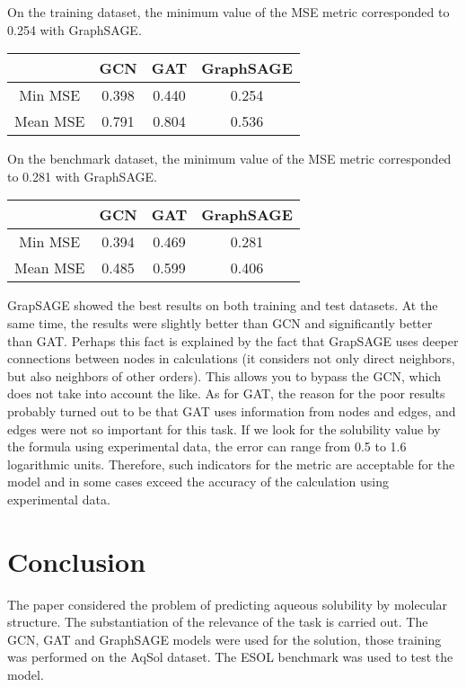 \documentclass[a4paper,14pt]{article}
\begin{document}
On the training dataset, the minimum value of the MSE metric corresponded to 0.254 with GraphSAGE.
\begin{center}
\begin{tabular}{ |c|c|c|c| }
\hline
  & GCN & GAT & GraphSAGE \\ 
 \hline
 Min MSE & 0.398 & 0.440 & 0.254 \\  
 \hline
 Mean MSE & 0.791 & 0.804 & 0.536   \\
 \hline
\end{tabular}
\end{center}

On the benchmark dataset, the minimum value of the MSE metric corresponded to 0.281 with GraphSAGE. 
\begin{center}
\begin{tabular}{ |c|c|c|c| }
\hline
  & GCN & GAT & GraphSAGE \\ 
 \hline
 Min MSE & 0.394 & 0.469 & 0.281 \\  
 \hline
 Mean MSE & 0.485 & 0.599 &  0.406  \\
 \hline
\end{tabular}
\end{center}

GrapSAGE showed the best results on both training and test datasets. At the same time, the results were slightly better than GCN and significantly better than GAT. Perhaps this fact is explained by the fact that GrapSAGE uses deeper connections between nodes in calculations (it considers not only direct neighbors, but also neighbors of other orders). This allows you to bypass the GCN, which does not take into account the like. As for GAT, the reason for the poor results probably turned out to be that GAT uses information from nodes and edges, and edges were not so important for this task.
If we look for the solubility value by the formula using experimental data, the error can range from 0.5 to 1.6 logarithmic units. Therefore, such indicators for the metric are acceptable for the model and in some cases exceed the accuracy of the calculation using experimental data.

\section{Conclusion}
The paper considered the problem of predicting aqueous solubility by molecular structure. The substantiation of the relevance of the task is carried out. The GCN, GAT and GraphSAGE models were used for the solution, those training was performed on the AqSol dataset. The ESOL benchmark was used to test the model.
\end{document}
